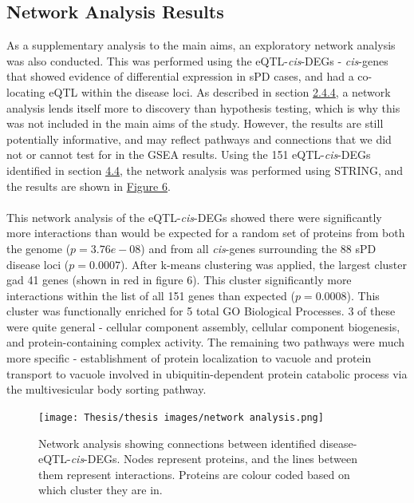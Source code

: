\documentclass{article}
\begin{document}
\subsection{Network Analysis Results}
As a supplementary analysis to the main aims, an exploratory network analysis was also conducted. This was performed using the eQTL-\textit{cis}-DEGs - \textit{cis}-genes that showed evidence of differential expression in sPD cases, and had a co-locating eQTL within the disease loci. As described in section \hyperref[subsubsec:pathwaysandnetworks]{2.4.4}, a network analysis lends itself more to discovery than hypothesis testing, which is why this was not included in the main aims of the study. However, the results are still potentially informative, and may reflect pathways and connections that we did not or cannot test for in the GSEA results. Using the 151 eQTL-\textit{cis}-DEGs identified in section \hyperref[subsec:DGE]{4.4}, the network analysis was performed using STRING\cite{Szklarczyk2023TheInterest}, and the results are shown in \hyperref[fig:network]{Figure 6}.
\\
\\This network analysis of the eQTL-\textit{cis}-DEGs showed there were significantly more interactions than would be expected for a random set of proteins from both the genome ($p = 3.76e-08$) and from all \textit{cis}-genes surrounding the 88 sPD disease loci ($p = 0.0007$). 
After k-means clustering was applied, the largest cluster gad 41 genes (shown in red in figure 6). This cluster significantly more interactions within the list of all 151 genes than expected ($p = 0.0008$).
This cluster was functionally enriched for 5 total GO Biological Processes. 3 of these were quite general - cellular component assembly, cellular component biogenesis, and protein-containing complex activity. The remaining two pathways were much more specific - establishment of protein localization to vacuole and protein transport to vacuole involved in ubiquitin-dependent protein catabolic process via the multivesicular body sorting pathway.
\newpage
\begin{landscape}
\begin{figure}[]
    \centering
    \texttt{[image: Thesis/thesis images/network analysis.png]}
    \caption{Network analysis showing connections between identified disease-eQTL-\textit{cis}-DEGs. Nodes represent proteins, and the lines between them represent interactions. Proteins are colour coded based on which cluster they are in.}
    \label{fig:network}
\end{figure}
\end{landscape}
\end{document}
